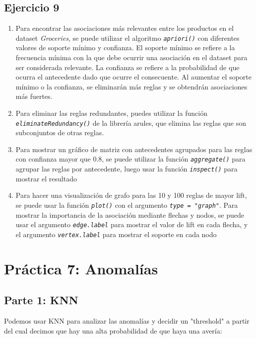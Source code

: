 \documentclass[
12pt, 
spanish, 
singlespacing,
headsepline
]{article}
\newcommand{\code}[1]{\textit{\texttt{#1}}}
\begin{document}
\subsection{Ejercicio 9}
\begin{enumerate}
\item Para encontrar las asociaciones más relevantes entre los productos en el dataset \emph{Groceries}, se puede utilizar el algoritmo \code{apriori()} con diferentes valores de soporte mínimo y confianza. El soporte mínimo se refiere a la frecuencia mínima con la que debe ocurrir una asociación en el dataset para ser considerada relevante. La confianza se refiere a la probabilidad de que ocurra el antecedente dado que ocurre el consecuente. Al aumentar el soporte mínimo o la confianza, se eliminarán más reglas y se obtendrán asociaciones más fuertes.

\item Para eliminar las reglas redundantes, puedes utilizar la función \code{eliminateRedundancy()} de la librería arules, que elimina las reglas que son subconjuntos de otras reglas.

\item Para mostrar un gráfico de matriz con antecedentes agrupados para las reglas con confianza mayor que 0.8, se puede utilizar la función \code{aggregate()} para agrupar las reglas por antecedente, luego usar la función \code{inspect()} para mostrar el resultado

\item Para hacer una visualización de grafo para las 10 y 100 reglas de mayor lift, se puede usar la función \code{plot()} con el argumento \code{type = "graph"}. Para mostrar la importancia de la asociación mediante flechas y nodos, se puede usar el argumento \code{edge.label} para mostrar el valor de lift en cada flecha, y el argumento \code{vertex.label} para mostrar el soporte en cada nodo
\end{enumerate}

\section{Práctica 7: Anomalías}

\subsection{Parte 1: KNN}
Podemos usar KNN para analizar las anomalías y decidir un "threshold" a partir del cual decimos que hay una alta probabilidad de que haya una avería:
\end{document}
